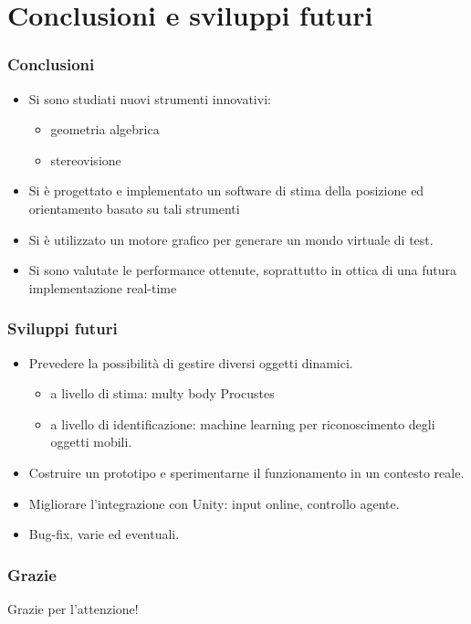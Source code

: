 \documentclass{beamer}
\begin{document}
\section{Conclusioni e sviluppi futuri}

\begin{frame}
\frametitle{Conclusioni}
\begin{itemize}
	\item Si sono studiati nuovi strumenti innovativi:
	\begin{itemize}
		\item geometria algebrica
		\item stereovisione
	\end{itemize}
	\item Si è progettato e implementato un software di stima della posizione ed orientamento basato su tali strumenti
	\item Si è utilizzato un motore grafico per generare un mondo virtuale di test.
	\item Si sono valutate le performance ottenute, soprattutto in ottica di una futura implementazione real-time
\end{itemize}
\end{frame}

\begin{frame}
\frametitle{Sviluppi futuri}
\begin{itemize}
	\item Prevedere la possibilità di gestire diversi oggetti dinamici.
	\begin{itemize}
		\item a livello di stima: multy body Procustes
		\item a livello di identificazione: machine learning per riconoscimento degli oggetti mobili.
	\end{itemize}
	\item Costruire un prototipo e sperimentarne il funzionamento in un contesto reale.
	\item Migliorare l'integrazione con Unity: input online, controllo agente.
	\item Bug-fix, varie ed eventuali.
\end{itemize}
\end{frame}

\begin{frame}
\frametitle{Grazie}
\Huge{\centerline{Grazie per l'attenzione!}}
\end{frame}
\end{document}
